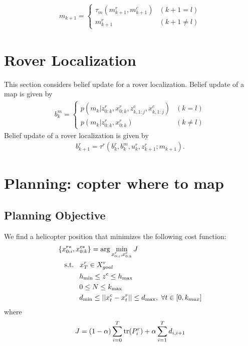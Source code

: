 \documentclass[conference]{IEEEtran}
\begin{document}
\begin{eqnarray}
m_{k+1} =
  \begin{cases}
    \tau_m (m^r_{k+1}, m^c_{k+1}) & (k+1 = l)\\
    m^r_{k+1} & (k+1 \neq l)
  \end{cases}
\end{eqnarray}

\section{Rover Localization}
This section considers belief update for a rover localization. Belief update of a map is given by
\begin{eqnarray}
    b^{m}_k=
    \begin{cases}
    p(m_k | z^r_{0:k}, x^r_{0:k}, z^c_{k,1:j}, x^c_{k,1:j}) & (k=l)\\
    p(m_k | z^r_{0:k}, x^r_{0:k}) & (k \neq l)
    \end{cases}
\end{eqnarray}
Belief update of a rover localization is given by
\begin{align}
    b^r_{k+1}=\tau^r (b^r_k, b^m_k, u^r_k, z^r_{k+1}; m_{k+1}).
\end{align}

\section{Planning: copter where to map}
\subsection{Planning Objective}

We find a helicopter position that minimizes the following cost function:
\begin{align}
  &\{ x^{r*}_{0:i}, x^{c*}_{0:k}\}={\rm arg} \min_{x^r_{0:i},x^c_{0:k}} J\\
  &\hspace{3mm}{\rm s.t.}\hspace{3mm}x^r_{T} \in X^r_{goal}\\
  &\hspace{10.5mm} h_{\min} \leq z^c \leq h_{\max}\\
  &\hspace{10.5mm} 0 \leq N \leq k_{\max}\\
  &\hspace{10.5mm} d_{\min} \leq ||x^c_t-x^r_t|| \leq d_{\max},~ \forall t \in [0,k_{max}]
\end{align}
where
\begin{align}
    J=(1-\alpha) \sum^T_{i=0}  {\rm tr}(P^r_i) +\alpha \sum^T_{i=1} d_{i,i+1}
\end{align}
\end{document}
